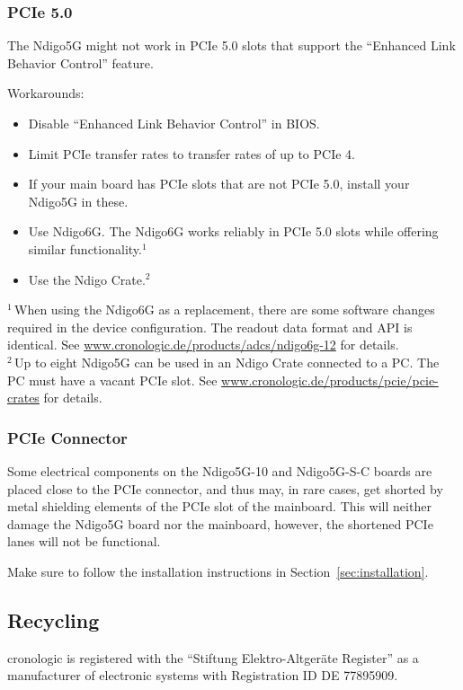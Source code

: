 \subsubsection{PCIe 5.0}
The Ndigo5G might not work in PCIe 5.0 slots that support the ``Enhanced Link Behavior Control'' feature.\par
Workarounds:
\begin{itemize}
    \item Disable ``Enhanced Link Behavior Control'' in BIOS.
    \item Limit PCIe transfer rates to transfer rates of up to PCIe 4.
    \item If your main board has PCIe slots that are not PCIe 5.0, install your Ndigo5G in these.
    \item Use Ndigo6G. The Ndigo6G works reliably in PCIe 5.0 slots while offering similar functionality.$^1$
    \item Use the Ndigo Crate.$^2$
\end{itemize}
{\small $^1$\,When using the Ndigo6G as a replacement, there are some software changes required in the device configuration. The readout data format and API is identical. See \href{https://www.cronologic.de/products/adcs/ndigo6g-12}{www.cronologic.de/products/adcs/ndigo6g-12} for details.}\\
{\small $^2$\,Up to eight Ndigo5G can be used in an Ndigo Crate connected to a PC. The PC must have a vacant PCIe slot. See \href{https://www.cronologic.de/products/pcie/pcie-crates}{www.cronologic.de/products/pcie/pcie-crates} for details.}

\subsubsection{PCIe Connector}
Some electrical components on the Ndigo5G-10 and Ndigo5G-S-C boards are placed close to the PCIe connector, and thus may, in rare cases, get shorted by metal shielding elements of the PCIe slot of the mainboard. This will neither damage the Ndigo5G board nor the mainboard, however, the shortened PCIe lanes will not be functional.

Make sure to follow the installation instructions in Section~\ref{sec:installation}.

\subsection{Recycling}

    cronologic is registered with the ``Stiftung Elektro-Altgeräte Register'' as a manufacturer of electronic systems with Registration ID DE 77895909.\par

